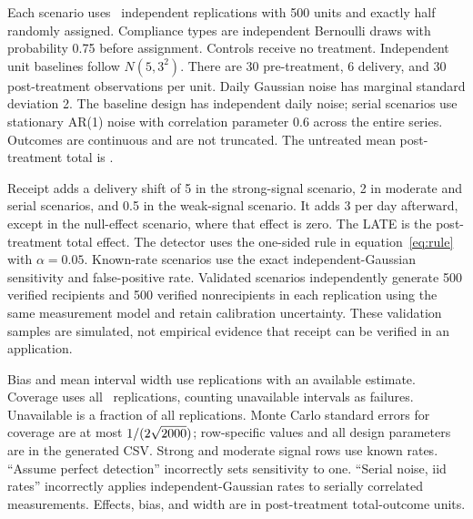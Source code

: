 \documentclass[11pt]{article}
\begin{document}
Each scenario uses \Replications\ independent replications with 500 units and exactly half randomly assigned. Compliance types are independent Bernoulli draws with probability 0.75 before assignment. Controls receive no treatment. Independent unit baselines follow $N(5,3^2)$. There are 30 pre-treatment, 6 delivery, and 30 post-treatment observations per unit. Daily Gaussian noise has marginal standard deviation 2. The baseline design has independent daily noise; serial scenarios use stationary AR(1) noise with correlation parameter 0.6 across the entire series. Outcomes are continuous and are not truncated. The untreated mean post-treatment total is \UntreatedMean.

Receipt adds a delivery shift of 5 in the strong-signal scenario, 2 in moderate and serial scenarios, and 0.5 in the weak-signal scenario. It adds 3 per day afterward, except in the null-effect scenario, where that effect is zero. The LATE is the post-treatment total effect. The detector uses the one-sided rule in equation~\eqref{eq:rule} with $\alpha=0.05$. Known-rate scenarios use the exact independent-Gaussian sensitivity and false-positive rate. Validated scenarios independently generate 500 verified recipients and 500 verified nonrecipients in each replication using the same measurement model and retain calibration uncertainty. These validation samples are simulated, not empirical evidence that receipt can be verified in an application.

\begin{table}[htbp]
\centering
\caption{Corrected LATE and 95\% Wald intervals across measurement scenarios.}
\label{tab:coverage}
\small

\par\smallskip
\begin{minipage}{\linewidth}\footnotesize
Bias and mean interval width use replications with an available estimate. Coverage uses all \Replications\ replications, counting unavailable intervals as failures. Unavailable is a fraction of all replications. Monte Carlo standard errors for coverage are at most $1/(2\sqrt{2000})$; row-specific values and all design parameters are in the generated CSV. Strong and moderate signal rows use known rates. ``Assume perfect detection'' incorrectly sets sensitivity to one. ``Serial noise, iid rates'' incorrectly applies independent-Gaussian rates to serially correlated measurements. Effects, bias, and width are in post-treatment total-outcome units.
\end{minipage}
\end{table}
\end{document}
